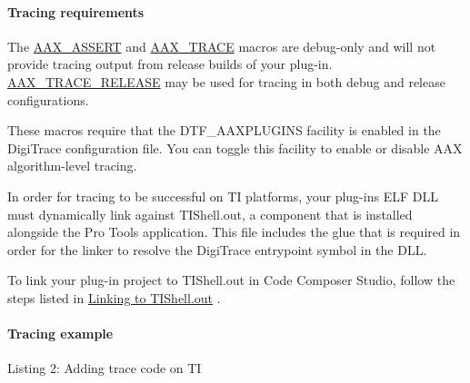 \hypertarget{a00362_subsubsection__tracing_requirements_}{}\paragraph{Tracing requirements}\label{a00362_subsubsection__tracing_requirements_}

\begin{DoxyItemize}
\item The \hyperlink{a00158_a168ee44fd7a5485ab50160db36fb2988}{A\+A\+X\+\_\+\+A\+S\+S\+E\+R\+T} and \hyperlink{a00158_ab53f1d6a94f8b6ebb3a101f71bfe4e82}{A\+A\+X\+\_\+\+T\+R\+A\+C\+E} macros are debug-\/only and will not provide tracing output from release builds of your plug-\/in. \hyperlink{a00158_ac2aa820ece56bb59140ad561218db4b3}{A\+A\+X\+\_\+\+T\+R\+A\+C\+E\+\_\+\+R\+E\+L\+E\+A\+S\+E} may be used for tracing in both debug and release configurations.  
\item These macros require that the {\ttfamily D\+T\+F\+\_\+\+A\+A\+X\+P\+L\+U\+G\+I\+N\+S} facility is enabled in the Digi\+Trace configuration file. You can toggle this facility to enable or disable A\+A\+X algorithm-\/level tracing.  
\item In order for tracing to be successful on T\+I platforms, your plug-\/in\textquotesingle{}s E\+L\+F D\+L\+L must dynamically link against T\+I\+Shell.\+out, a component that is installed alongside the Pro Tools application. This file includes the \textquotesingle{}glue\textquotesingle{} that is required in order for the linker to resolve the Digi\+Trace entrypoint symbol in the D\+L\+L.  
\end{DoxyItemize}

To link your plug-\/in project to T\+I\+Shell.\+out in Code Composer Studio, follow the steps listed in \hyperlink{a00362_subsubsection__linking_to_tishellout_}{Linking to T\+I\+Shell.\+out} .

\hypertarget{a00362_subsubsection__tracing_example_}{}\paragraph{Tracing example}\label{a00362_subsubsection__tracing_example_}



  Listing 2\+: Adding trace code on T\+I


